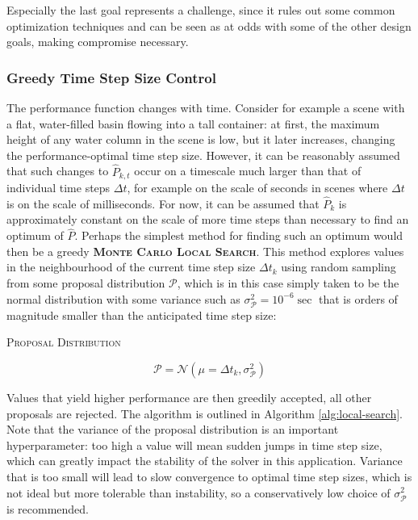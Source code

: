 \documentclass[oneside, a4paper]{book}
\newcommand\emphasis[1]{{\scshape\bfseries#1}}
\newcommand{\equationnamed}[2]{%
  \setlength{\fboxsep}{2pt} %
  \setlength{\fboxrule}{0.01pt}
  \begin{center}
    \begin{minipage}{\textwidth}
      \begin{center}\textsc{#1}\end{center}
      #2
    \end{minipage}
  \end{center}
}
\newcommand\br[1]{\left(#1\right)}
\begin{document}
    Especially the last goal represents a challenge, since it rules out some common optimization techniques and can be seen as at odds with some of the other design goals, making compromise necessary.

    \subsubsection{Greedy Time Step Size Control}
    The performance function changes with time. Consider for example a scene with a flat, water-filled basin flowing into a tall container: at first, the maximum height of any water column in the scene is low, but it later increases, changing the performance-optimal time step size. However, it can be reasonably assumed that such changes to $\hat{P}_{k,t}$ occur on a timescale much larger than that of individual time steps $\Delta t$, for example on the scale of seconds in scenes where $\Delta t$ is on the scale of milliseconds. For now, it can be assumed that $\hat{P}_k$ is approximately constant on the scale of more time steps than necessary to find an optimum of $\hat{P}$. Perhaps the simplest method for finding such an optimum would then be a greedy \emphasis{Monte Carlo Local Search}. This method explores values in the neighbourhood of the current time step size $\Delta t_k$ using random sampling from some proposal distribution $\mathcal{P}$, which is in this case simply taken to be the normal distribution with some variance such as $\sigma^2_\mathcal{P}=10^{-6}\sec$ that is orders of magnitude smaller than the anticipated time step size:
    \equationnamed{Proposal Distribution}{
    \begin{equation}
      \mathcal{P} = \mathcal{N}\br{\mu = \Delta t_k, \sigma^2_\mathcal{P}}
    \end{equation}
    }

    Values that yield higher performance are then greedily accepted, all other proposals are rejected. The algorithm is outlined in Algorithm \ref{alg:local-search}.
    Note that the variance of the proposal distribution is an important hyperparameter: too high a value will mean sudden jumps in time step size, which can greatly impact the stability of the solver in this application. Variance that is too small will lead to slow convergence to optimal time step sizes, which is not ideal but more tolerable than instability, so a conservatively low choice of $\sigma^2_\mathcal{P}$ is recommended.
\end{document}
